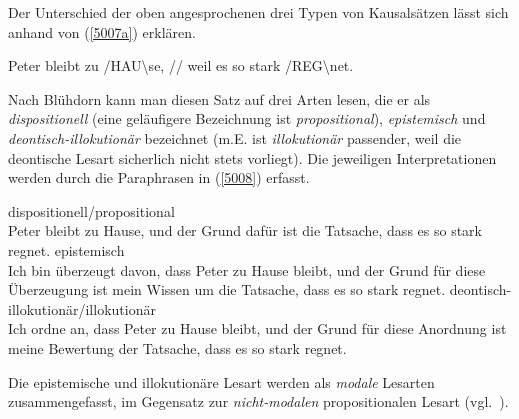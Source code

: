 Der Unterschied der oben angesprochenen drei Typen von Kausalsätzen lässt sich anhand von (\ref{5007a}) erklären.

\begin{exe}
	\ex\label{5007a} 
	Peter bleibt zu /HAU\textbackslash se, // weil es so stark /REG\textbackslash net. 		 
	\hfill\hbox{\citet[265]{Bluehdorn2006}}	
\end{exe}
Nach Blühdorn kann man diesen Satz auf drei Arten lesen, die er  als \textit{dispositionell} (eine geläufigere Bezeichnung ist  \textit{propositional}), \textit{epistemisch} und \textit{deontisch-illokutionär} bezeichnet (m.E. ist \textit{illokutionär} passender, weil die deontische Lesart sicherlich nicht stets vorliegt). Die jeweiligen Interpretationen werden durch die Paraphrasen in (\ref{5008}) erfasst.	
 		                   							   
\begin{exe}
	\ex\label{5008} 
		\begin{xlist}	
			\ex\label{5008a} dispositionell/propositional\\
			Peter bleibt zu Hause, und der Grund dafür ist die Tatsache, dass es so stark  regnet.
			\ex\label{5008b} epistemisch\\
			Ich bin überzeugt davon, dass Peter zu Hause bleibt, und der Grund für diese Überzeugung ist mein Wissen um die Tatsache, dass es so stark 					regnet.	
			\ex\label{5008c} deontisch-illokutionär/illokutionär\\
			Ich ordne an, dass Peter zu Hause bleibt, und der Grund für diese Anordnung ist meine Bewertung der Tatsache, dass es so stark regnet.\\
			\hbox{}\hfill\hbox{\citet[265]{Bluehdorn2006}}			
		\end{xlist}
\end{exe}	
Die epistemische und illokutionäre Lesart werden als \textit{modale} Lesarten  zusammengefasst, im Gegensatz zur \textit{nicht-modalen} propositionalen Lesart (vgl.\ \citealt[265--266]{Bluehdorn2006}).

